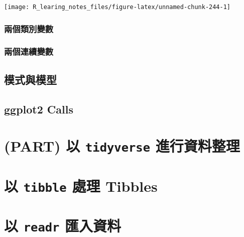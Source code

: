 \documentclass[
]{book}
\theoremstyle{definition}
\theoremstyle{remark}
\begin{document}
\begin{center}\texttt{[image: R\_learing\_notes\_files/figure-latex/unnamed-chunk-244-1]} \end{center}

\hypertarget{ux5169ux500bux985eux5225ux8b8aux6578}{%
\subsection{兩個類別變數}\label{ux5169ux500bux985eux5225ux8b8aux6578}}

\hypertarget{ux5169ux500bux9023ux7e8cux8b8aux6578}{%
\subsection{兩個連續變數}\label{ux5169ux500bux9023ux7e8cux8b8aux6578}}

\hypertarget{ux6a21ux5f0fux8207ux6a21ux578b}{%
\section{模式與模型}\label{ux6a21ux5f0fux8207ux6a21ux578b}}

\hypertarget{ggplot2-calls}{%
\section{ggplot2 Calls}\label{ggplot2-calls}}

\hypertarget{part-ux4ee5-tidyverse-ux9032ux884cux8cc7ux6599ux6574ux7406}{%
\chapter*{\texorpdfstring{(PART) 以 \texttt{tidyverse} 進行資料整理}{(PART) 以 tidyverse 進行資料整理}}\label{part-ux4ee5-tidyverse-ux9032ux884cux8cc7ux6599ux6574ux7406}}

\hypertarget{ux4ee5-tibble-ux8655ux7406-tibbles}{%
\chapter{\texorpdfstring{以 \texttt{tibble} 處理 Tibbles}{以 tibble 處理 Tibbles}}\label{ux4ee5-tibble-ux8655ux7406-tibbles}}

\hypertarget{ux4ee5-readr-ux532fux5165ux8cc7ux6599}{%
\chapter{\texorpdfstring{以 \texttt{readr} 匯入資料}{以 readr 匯入資料}}\label{ux4ee5-readr-ux532fux5165ux8cc7ux6599}}
\end{document}
